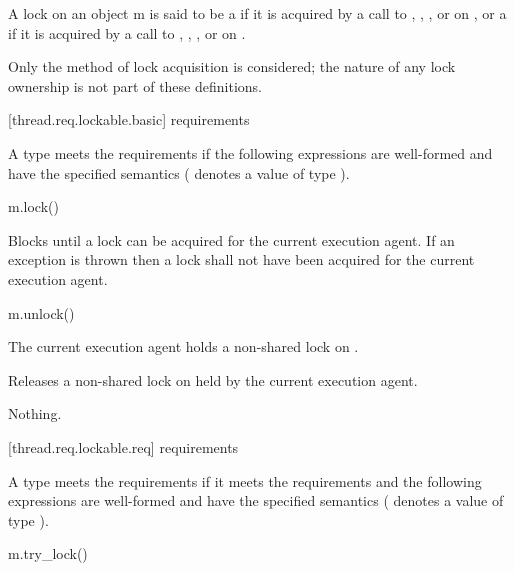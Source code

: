 \pnum
A lock on an object m is said to be
a  if it is acquired by a call to
,
,
, or
 on , or
a  if it is acquired by a call to
,
,
, or
 on .
\begin{note}
Only the method of lock acquisition is considered;
the nature of any lock ownership is not part of these definitions.
\end{note}

[thread.req.lockable.basic]{ requirements}

\pnum
A type  meets the  requirements if the following expressions are
well-formed and have the specified semantics ( denotes a value of type ).

\begin{itemdecl}
m.lock()
\end{itemdecl}

\begin{itemdescr}
\pnum
{}%
\effects
Blocks until a lock can be acquired for the current execution agent. If an exception
is thrown then a lock shall not have been acquired for the current execution agent.
\end{itemdescr}

\begin{itemdecl}
m.unlock()
\end{itemdecl}

\begin{itemdescr}
\pnum
\expects
The current execution agent holds a non-shared lock on .

\pnum
\effects
Releases a non-shared lock on  held by the current execution agent.

\pnum
\throws
Nothing.
\end{itemdescr}

[thread.req.lockable.req]{ requirements}

\pnum
A type  meets the  requirements if it meets the 
requirements and the following expressions are well-formed and have the specified semantics
( denotes a value of type ).

\begin{itemdecl}
m.try_lock()
\end{itemdecl}

